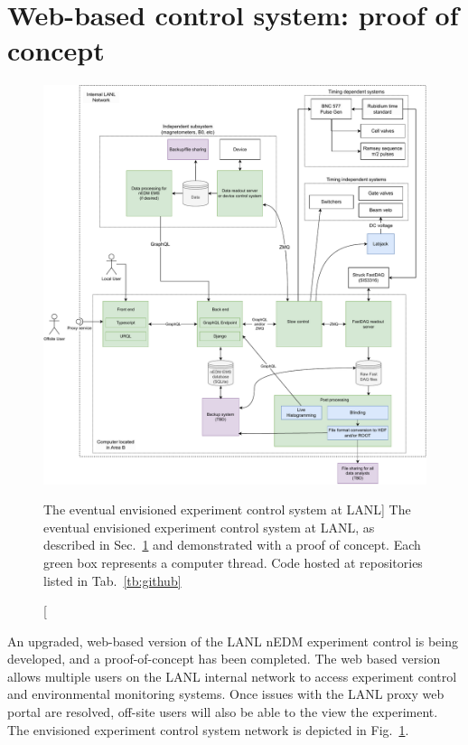 
\section{Web-based control system: proof of concept}\label{sec:web_control}


\begin{figure}
    \centering
    \includegraphics[width=\textwidth]{figures/LANL_nEDM_network.pdf}
    \caption
    [The eventual envisioned experiment control system at LANL]
     {The eventual envisioned experiment control system at LANL, as described in Sec.~\ref{sec:web_control} and demonstrated with a proof of concept. Each green box represents a computer thread. Code hosted at repositories listed in Tab.~\ref{tb:github}}
    \label{fig:LANL_nEDM_network}
\end{figure}

An upgraded, web-based version of the LANL nEDM experiment control is being developed, and a proof-of-concept has been completed. The web based version allows multiple users on the LANL internal network to access experiment control and environmental monitoring systems. Once issues with the LANL proxy web portal are resolved, off-site users will also be able to the view the experiment. The envisioned experiment control system network is depicted in Fig.~\ref{fig:LANL_nEDM_network}.


